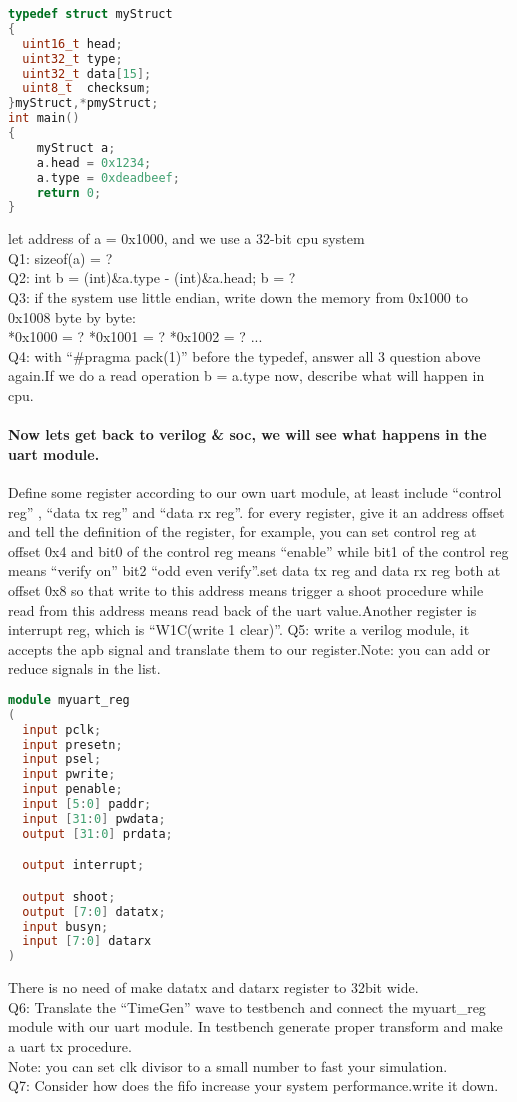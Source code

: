 \documentclass{article}
\begin{document}
\begin{lstlisting}[language=c]
typedef struct myStruct
{
  uint16_t head;
  uint32_t type;
  uint32_t data[15];
  uint8_t  checksum;
}myStruct,*pmyStruct;
int main()
{
	myStruct a;
	a.head = 0x1234;
	a.type = 0xdeadbeef;
    return 0;
}
\end{lstlisting}

let address of a = 0x1000, and we use a 32-bit cpu system\\
Q1: sizeof(a) = ?\\
Q2: int b = (int)\&a.type - (int)\&a.head; b = ?\\
Q3: if the system use little endian, write down the memory from 0x1000 to 0x1008 byte by byte:\\
*0x1000 = ? *0x1001 = ? *0x1002 = ? ...\\
Q4: with ``#pragma pack(1)'' before the typedef, answer all 3 question above again.If we do a read operation
b = a.type now, describe what will happen in cpu.\\
\paragraph{Now lets get back to verilog \& soc, we will see what happens in the uart module.\\}
Define some register according to our own uart module, at least include ``control reg'' , ``data tx reg'' and ``data rx reg''.
for every register, give it an address offset and tell the definition of the register, for example, you can set control reg at offset 0x4
and bit0 of the control reg means ``enable'' while bit1 of the control reg means ``verify on'' bit2 ``odd even verify''.set data tx reg
and data rx reg both at offset 0x8 so that write to this address means trigger a shoot procedure while read from this address means read back
of the uart value.Another register is interrupt reg, which is ``W1C(write 1 clear)''.
Q5: write a verilog module, it accepts the apb signal and translate them to our register.Note: you can add or reduce signals in the list.
\begin{lstlisting}[language=verilog]
module myuart_reg
(
  input pclk;
  input presetn;
  input psel;
  input pwrite;
  input penable;
  input [5:0] paddr;
  input [31:0] pwdata;
  output [31:0] prdata;

  output interrupt;

  output shoot;
  output [7:0] datatx;
  input busyn;
  input [7:0] datarx
)
\end{lstlisting}
There is no need of make datatx and datarx register to 32bit wide.\\
Q6: Translate the ``TimeGen'' wave to testbench and connect the myuart\_reg module with our uart module.
In testbench generate proper transform and make a uart tx procedure.\\
Note: you can set clk divisor to a small number to fast your simulation.\\
Q7: Consider how does the fifo increase your system performance.write it down.
\end{document}

